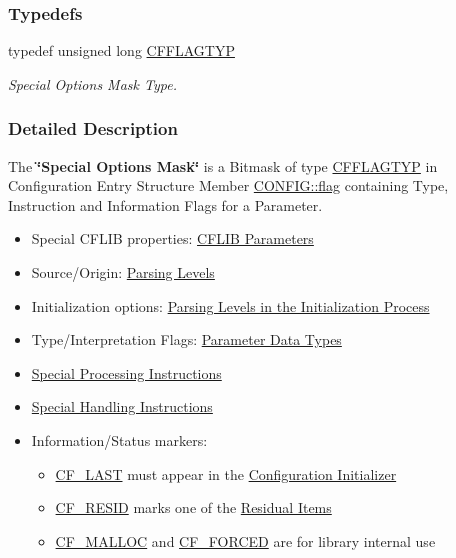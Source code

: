 \subsubsection*{Typedefs}
\begin{CompactItemize}
\item 
\hypertarget{group__special__options__mask_g4854f1596d5c6e0604a478fa9a2e23f0}{
typedef unsigned long \hyperlink{group__special__options__mask_g4854f1596d5c6e0604a478fa9a2e23f0}{CFFLAGTYP}}
\label{group__special__options__mask_g4854f1596d5c6e0604a478fa9a2e23f0}

\begin{CompactList}\small\item\em Special Options Mask Type. \item\end{CompactList}\end{CompactItemize}


\subsubsection{Detailed Description}
The {\bf \char`\"{}Special Options Mask\char`\"{}} is a Bitmask of type \hyperlink{group__special__options__mask_g4854f1596d5c6e0604a478fa9a2e23f0}{CFFLAGTYP} in Configuration Entry Structure Member \hyperlink{struct_c_o_n_f_i_g_b04d08abdf758c0400caaded716f4089}{CONFIG::flag} containing Type, Instruction and Information Flags for a Parameter. 

\begin{itemize}
\item Special CFLIB properties: \hyperlink{parameter_types_cflib_parameters}{CFLIB Parameters}\item Source/Origin: \hyperlink{config_levels_parsing_levels}{Parsing Levels}\item Initialization options: \hyperlink{config_levels_initialization_process}{Parsing Levels in the Initialization Process}\item Type/Interpretation Flags: \hyperlink{parameter_types_parameter_datatypes}{Parameter Data Types}\item \hyperlink{parameter_types_processing_instructions}{Special Processing Instructions}\item \hyperlink{parameter_types_handling_instructions}{Special Handling Instructions}\item Information/Status markers: \begin{itemize}
\item \hyperlink{group__special__options__mask_ga4d82cea91ede4aee78594417894e368}{CF\_\-LAST} must appear in the \hyperlink{config_initializer}{Configuration Initializer} \item \hyperlink{group__special__options__mask_g5415b257c706aae33d91d3947a3429c0}{CF\_\-RESID} marks one of the \hyperlink{config_levels_residuals}{Residual Items} \item \hyperlink{group__special__options__mask_g2b971231bd3cbad743ef2f4e0a613a47}{CF\_\-MALLOC} and \hyperlink{group__special__options__mask_g618e7187ee15bacfe668e72a858e71fc}{CF\_\-FORCED} are for library internal use \end{itemize}
\end{itemize}
